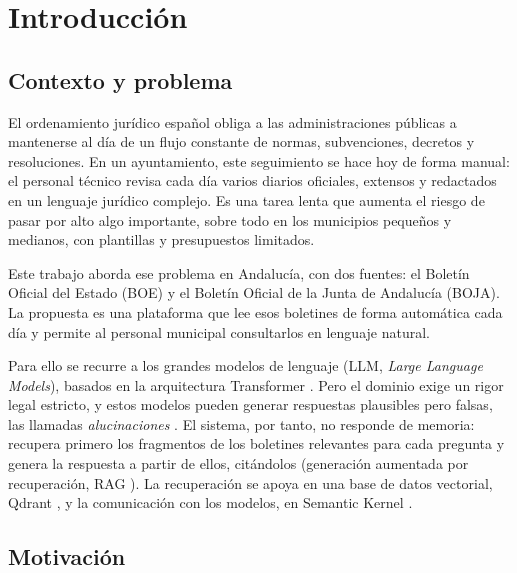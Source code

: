 \chapter{Introducción}
\label{cap:introduccion}

\section{Contexto y problema}
\label{sec:contexto}

El ordenamiento jurídico español obliga a las administraciones públicas a mantenerse al día de un flujo constante de normas, subvenciones, decretos y resoluciones. En un ayuntamiento, este seguimiento se hace hoy de forma manual: el personal técnico revisa cada día varios diarios oficiales, extensos y redactados en un lenguaje jurídico complejo. Es una tarea lenta que aumenta el riesgo de pasar por alto algo importante, sobre todo en los municipios pequeños y medianos, con plantillas y presupuestos limitados.

Este trabajo aborda ese problema en Andalucía, con dos fuentes: el Boletín Oficial del Estado (BOE) y el Boletín Oficial de la Junta de Andalucía (BOJA). La propuesta es una plataforma que lee esos boletines de forma automática cada día y permite al personal municipal consultarlos en lenguaje natural.

Para ello se recurre a los grandes modelos de lenguaje (LLM, \emph{Large Language Models}), basados en la arquitectura Transformer \cite{vaswani2017}. Pero el dominio exige un rigor legal estricto, y estos modelos pueden generar respuestas plausibles pero falsas, las llamadas \emph{alucinaciones} \cite{huang2023}. El sistema, por tanto, no responde de memoria: recupera primero los fragmentos de los boletines relevantes para cada pregunta y genera la respuesta a partir de ellos, citándolos (generación aumentada por recuperación, RAG \cite{lewis2020}). La recuperación se apoya en una base de datos vectorial, Qdrant \cite{pan2024survey,qdrant}, y la comunicación con los modelos, en Semantic Kernel \cite{semantickernel}.

\section{Motivación}
\label{sec:motivacion}

